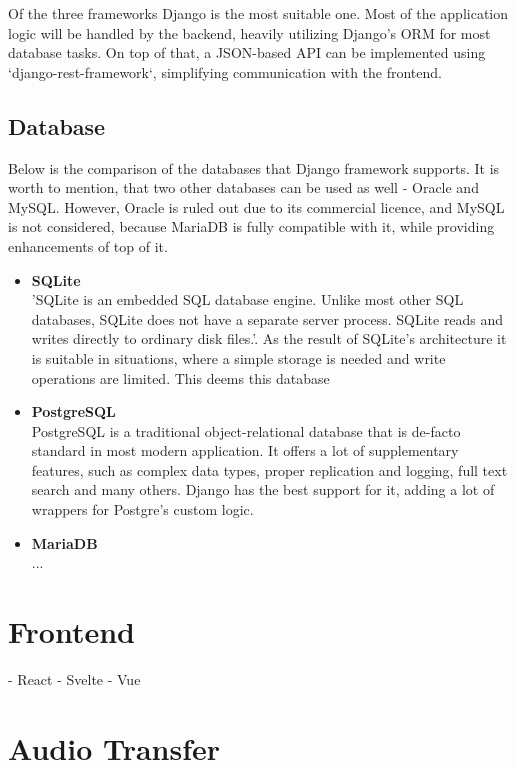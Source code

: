 Of the three frameworks Django is the most suitable one.
Most of the application logic will be handled by the backend, heavily utilizing
Django's ORM for most database tasks. On top of that, a JSON-based API can be implemented
using `django-rest-framework`, simplifying communication with the frontend.

\subsection{Database}
Below is the comparison of the databases that Django framework supports.
It is worth to mention, that two other databases can be used as well - Oracle and MySQL.
However, Oracle is ruled out due to its commercial licence, and MySQL is not considered, because
MariaDB is fully compatible with it, while providing enhancements of top of it.


\begin{itemize}
    \item \textbf{SQLite} \\
    'SQLite is an embedded SQL database engine.
    Unlike most other SQL databases, SQLite does not have a separate
    server process. SQLite reads and writes directly to ordinary disk
    files.'\cite{sqlite}. As the result of SQLite's architecture it is suitable
    in situations, where a simple storage is needed and write operations are limited.
    This deems this database

    \item \textbf{PostgreSQL} \\
    PostgreSQL is a traditional object-relational database that is de-facto standard in most
    modern application. It offers a lot of supplementary features, such as complex data types,
    proper replication and logging, full text search and many others. Django has the best support for it,
    adding a lot of wrappers for Postgre's custom logic.

    \item \textbf{MariaDB} \\
    ...
\end{itemize}


\section{Frontend}

- React
- Svelte
- Vue


\section{Audio Transfer}

